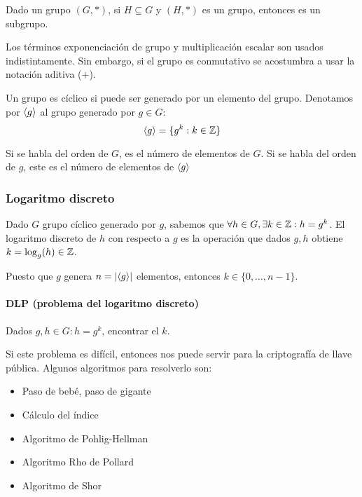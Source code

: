   \begin{definition}[Subgrupo]
    Dado un grupo $(G, *)$, si $H \subseteq G$ y $(H, *)$ es un grupo, entonces es un subgrupo.
  \end{definition}
  
  Los términos exponenciación de grupo y multiplicación escalar son usados indistintamente.
  Sin embargo, si el grupo es conmutativo se acostumbra a usar la notación aditiva ($+$).

  \begin{definition}
    Un grupo es cíclico si puede ser generado por un elemento del grupo.
    Denotamos por $\left\langle g \right\rangle$ al grupo generado por $g\in G$:
    \begin{equation*}
      \left\langle g \right\rangle = \{g^k : k \in \mathbb{Z}\}
    \end{equation*}
  \end{definition}
  \begin{remark}
    Si se habla del orden de $G$, es el número de elementos de $G$.
    Si se habla del orden de $g$, este es el número de elementos de $\left\langle g \right\rangle$
  \end{remark}

  \subsubsection{Logaritmo discreto}
  \begin{definition}
    Dado $G$ grupo cíclico generado por $g$, sabemos que $\forall h\in G, \exists k \in \mathbb{Z} : h = g^k$.
    El logaritmo discreto de $h$ con respecto a $g$ es la operación que dados $g, h$
    obtiene $k=\log_g(h) \in \mathbb{Z}$.
  \end{definition}
  \begin{remark}
    Puesto que $g$ genera $n=\left| \left\langle g \right\rangle \right|$ elementos, entonces $k\in\{0,\dots,n-1\}$.
  \end{remark}

  \paragraph{DLP (problema del logaritmo discreto)}
  Dados $g,h \in G : h=g^k$, encontrar el $k$.

  Si este problema es difícil, entonces nos puede servir para la criptografía de llave pública.
  Algunos algoritmos para resolverlo son:
  \begin{itemize}
    \item Paso de bebé, paso de gigante 
    \item Cálculo del índice
    \item Algoritmo de Pohlig-Hellman 
    \item Algoritmo Rho de Pollard 
    \item Algoritmo de Shor
  \end{itemize}

